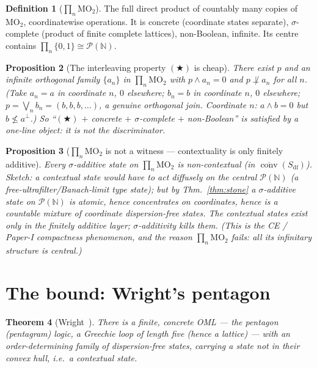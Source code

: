 \documentclass[11pt]{article}
\newtheorem{theorem}{Theorem}[section]
\newtheorem{proposition}[theorem]{Proposition}
\theoremstyle{definition}
\newtheorem{definition}[theorem]{Definition}
\theoremstyle{remark}
\newcommand{\MOO}{\mathrm{MO}_2}
\newcommand{\df}{\mathrm{df}}            %
\newcommand{\conv}{\overline{\operatorname{conv}}}
\begin{document}
\begin{definition}[$\prod_n\MOO$]\label{def:product}
The full direct product of countably many copies of $\MOO$, coordinatewise
operations. It is concrete (coordinate states separate), $\sigma$-complete (product
of finite complete lattices), non-Boolean, infinite. Its centre contains
$\prod_n\{0,1\}\cong\mathcal P(\mathbb N)$.
\end{definition}

\begin{proposition}[The interleaving property $(\bigstar)$ is cheap]\label{prop:star}
There exist $p$ and an infinite orthogonal family $\{a_n\}$ in $\prod_n\MOO$ with
$p\wedge a_n=0$ and $p\not\perp a_n$ for all $n$. \textup{(}Take $a_n=a$ in
coordinate $n$, $0$ elsewhere; $b_n=b$ in coordinate $n$, $0$ elsewhere;
$p=\bigvee_n b_n=(b,b,b,\dots)$, a genuine orthogonal join. Coordinate $n$:
$a\wedge b=0$ but $b\not\le a^{\perp}$.\textup{)} So ``$(\bigstar)$ $+$ concrete $+$
$\sigma$-complete $+$ non-Boolean'' is satisfied by a one-line object: it is
\emph{not} the discriminator.
\end{proposition}

\begin{proposition}[$\prod_n\MOO$ is not a witness --- contextuality is only finitely additive]\label{prop:prodnotwitness}
Every $\sigma$-additive state on $\prod_n\MOO$ is non-contextual (in
$\conv(S_{\df})$). Sketch: a contextual state would have to act diffusely on the
central $\mathcal P(\mathbb N)$ (a free-ultrafilter/Banach-limit type state); but by
Thm.~\ref{thm:stone} a $\sigma$-additive state on $\mathcal P(\mathbb N)$ is atomic,
hence concentrates on coordinates, hence is a countable mixture of coordinate
dispersion-free states. The contextual states exist only in the \emph{finitely
additive} layer; $\sigma$-additivity kills them. (This is the CE / Paper-I
compactness phenomenon, and the reason $\prod_n\MOO$ fails: all its infinitary
structure is \emph{central}.)
\end{proposition}

\section{The bound: Wright's pentagon}\label{sec:wright}

\begin{theorem}[Wright~\cite{Wright1978}]\label{thm:wright}
There is a \emph{finite}, \emph{concrete} OML --- the pentagon (pentagram) logic, a
Greechie loop of length five (hence a lattice) --- with an order-determining family
of dispersion-free states, carrying a state \emph{not} in their convex hull, i.e.\
a \emph{contextual} state.
\end{theorem}
\end{document}
